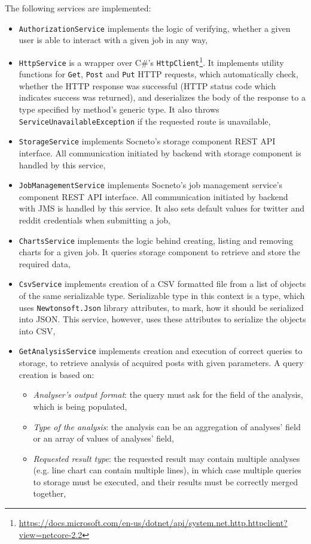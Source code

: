 The following services are implemented:
\begin{itemize}
    \item \texttt{AuthorizationService} implements the logic of verifying, whether a given user is able to interact with a given job in any way,
    
    \item \texttt{HttpService} is a wrapper over C\#'s \texttt{HttpClient}\footnote{\url{https://docs.microsoft.com/en-us/dotnet/api/system.net.http.httpclient?view=netcore-2.2}}. It implements utility functions for \texttt{Get}, \texttt{Post} and \texttt{Put} HTTP requests, which automatically check, whether the HTTP response was successful (HTTP status code which indicates success was returned), and deserializes the body of the response to a type specified by method's generic type. It also throws \texttt{ServiceUnavailableException} if the requested route is unavailable,
    
    \item \texttt{StorageService} implements Socneto's storage component REST API interface. All communication initiated by backend with storage component is handled by this service,

    \item \texttt{JobManagementService} implements Socneto's job management service's component REST API interface. All communication initiated by backend with JMS is handled by this service. It also sets default values for twitter and reddit credentials when submitting a job,

    \item \texttt{ChartsService} implements the logic behind creating, listing and removing charts for a given job. It queries storage component to retrieve and store the required data,
    
    \item \texttt{CsvService} implements creation of a CSV formatted file from a list of objects of the same serializable type. Serializable type in this context is a type, which uses \texttt{Newtonsoft.Json} library attributes, to mark, how it should be serialized into JSON. This service, however, uses these attributes to serialize the objects into CSV,
    
    \item \texttt{GetAnalysisService} implements creation and execution of correct queries to storage, to retrieve analysis of acquired posts with given parameters. A query creation is based on:
    \begin{itemize}
        \item \textit{Analyser's output format}: the query must ask for the field of the analysis, which is being populated,
        \item \textit{Type of the analysis}: the analysis can be an aggregation of analyses' field or an array of values of analyses' field,
        \item \textit{Requested result type}: the requested result may contain multiple analyses (e.g. line chart can contain multiple lines), in which case multiple queries to storage must be executed, and their results must be correctly merged together,
    \end{itemize}


\end{itemize}
